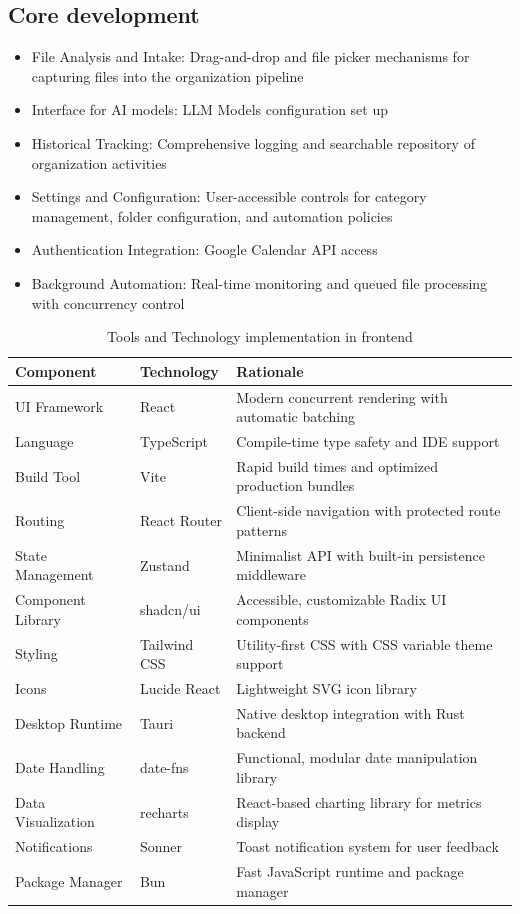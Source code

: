 \documentclass[12pt,oneside,openright,a4paper]{cpe-english-project}
\begin{document}
\subsection*{Core development}
\begin{itemize}
\item File Analysis and Intake: Drag-and-drop and file picker mechanisms for capturing files into the organization pipeline
\item Interface for AI models: LLM Models configuration set up
\item Historical Tracking: Comprehensive logging and searchable repository of organization activities
\item Settings and Configuration: User-accessible controls for category management, folder configuration, and automation policies
\item Authentication Integration: Google Calendar API access
\item Background Automation: Real-time monitoring and queued file processing with concurrency control
\end{itemize}
\begin{longtable}{|p{}|p{}|p{}|}
\caption{Tools and Technology implementation in frontend}\\
\hline
\textbf{Component} & \textbf{Technology} & \textbf{Rationale} \\
\hline
UI Framework & React & Modern concurrent rendering with automatic batching \\
\hline
Language & TypeScript & Compile-time type safety and IDE support \\
\hline
Build Tool & Vite & Rapid build times and optimized production bundles \\
\hline
Routing & React Router & Client-side navigation with protected route patterns \\
\hline
State Management & Zustand & Minimalist API with built-in persistence middleware \\
\hline
Component Library & shadcn/ui & Accessible, customizable Radix UI components \\
\hline
Styling & Tailwind CSS & Utility-first CSS with CSS variable theme support \\
\hline
Icons & Lucide React & Lightweight SVG icon library \\
\hline
Desktop Runtime & Tauri & Native desktop integration with Rust backend \\
\hline
Date Handling & date-fns & Functional, modular date manipulation library \\
\hline
Data Visualization & recharts & React-based charting library for metrics display \\
\hline
Notifications & Sonner & Toast notification system for user feedback \\
\hline
Package Manager & Bun & Fast JavaScript runtime and package manager \\
\hline
\end{longtable}
\end{document}
